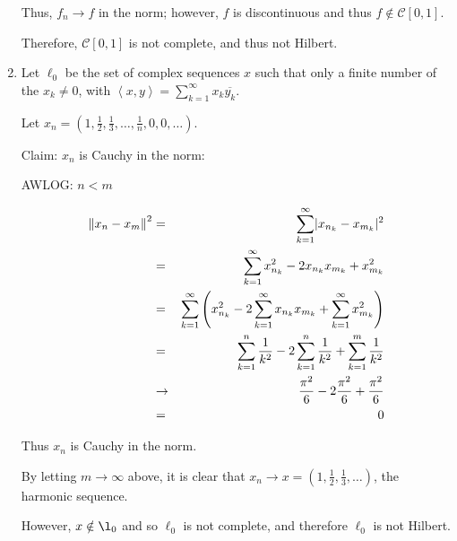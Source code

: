 \documentclass[letterpaper,12pt,fleqn]{article}
\newcommand{\norm}[1]{\left\|#1\right\|}
\newcommand{\inner}[2]{\left<#1,#2\right>}
\newcommand{\conj}[1]{\overline{#1}}
\newcommand{\mc}{\mathcal{C}}
\begin{document}
\begin{examples}
\begin{enumerate}
    Thus, $f_n\to f$ in the norm; however, $f$ is discontinuous and thus
    $f\notin\mc[0,1]$.

    Therefore, $\mc[0,1]$ is not complete, and thus not Hilbert.

    \bigskip

  \item Let $\ell_0$ be the set of complex sequences $x$ such that only a
    finite number of the $x_k\ne0$, with
    $\inner{x}{y}=\sum_{k=1}^{\infty}x_k\conj{y_k}$.

    Let $x_n=
    \left(1,\frac{1}{2},\frac{1}{3},\ldots,\frac{1}{n},0,0,\ldots\right)$.

    Claim: $x_n$ is Cauchy in the norm:

    AWLOG: $n<m$
    
    \begin{eqnarray*}
      \norm{x_n-x_m}^2 &=& \sum_{k=1}^{\infty}\abs{x_{n_k}-x_{m_k}}^2 \\
      &=& \sum_{k=1}^{\infty}x_{n_k}^2-2x_{n_k}x_{m_k}+x_{m_k}^2 \\
      &=& \sum_{k=1}^{\infty}\left(x_{n_k}^2-2\sum_{k=1}^{\infty}x_{n_k}x_{m_k}+
      \sum_{k=1}^{\infty}x_{m_k}^2\right) \\
      &=& \sum_{k=1}^n\frac{1}{k^2}-2\sum_{k=1}^n\frac{1}{k^2}+
      \sum_{k=1}^m\frac{1}{k^2} \\
      &\to& \frac{\pi^2}{6}-2\frac{\pi^2}{6}+\frac{\pi^2}{6} \\
      &=& 0
    \end{eqnarray*}

    Thus $x_n$ is Cauchy in the norm.

    By letting $m\to\infty$ above, it is clear that
    $x_n\to x=\left(1,\frac{1}{2},\frac{1}{3},\ldots\right)$, the harmonic
    sequence.

    However, $x\notin\l_0$ and so $\ell_0$ is not complete, and therefore
    $\ell_0$ is not Hilbert.
  \end{enumerate}
\end{examples}
\end{document}
